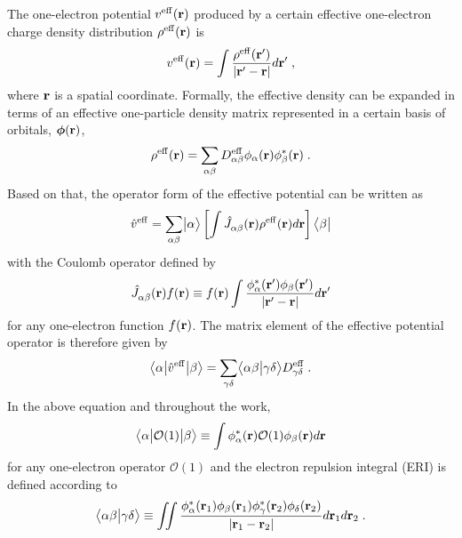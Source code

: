 The one\hyp{}electron potential $v^{\rm eff}({\bf r})$
produced by a certain effective one\hyp{}electron charge density distribution $\rho^{\rm eff}({\bf r})$
is 
%
\begin{equation} \label{e:v-eff}
	v^{\rm eff}({\bf r}) = \int \frac{ \rho^{\rm eff}({\bf r}') }{ \vert {\bf r}' - {\bf r} \vert} d{\bf r}' \;,
\end{equation}
%
where ${\bf r}$ is a spatial coordinate. Formally, the effective density can be expanded in terms of an effective
one\hyp{}particle density matrix represented in a certain basis of orbitals, $\BM{\phi}({\bf r})$,
%
\begin{equation} \label{e:d-spectral}
	\rho^{\rm eff}({\bf r}) = \sum_{\alpha\beta} D_{\alpha\beta}^{\rm eff} 
	\phi_\alpha({\bf r}) \phi_\beta^{*}({\bf r})  \;.
\end{equation}
%
Based on that, the operator form of the effective potential 
can be written as
%
\begin{equation} \label{e:oep-operator}
	\hat{v}^{\rm eff} = \sum_{\alpha\beta} 
	\Ket{\alpha} 
	\left[
	\int
	\hat{J}^{\rm}_{\alpha\beta}({\bf r}) 
	\rho^{\rm eff}({\bf r})
	d{\bf r} 
	\right]
	\Bra{\beta}  
\end{equation}
%
with the Coulomb operator defined by
%
\begin{equation}
	\hat{J}^{\rm}_{\alpha\beta}({\bf r}) f({\bf r}) \equiv
	f({\bf r}) 
	\int
	\frac{ \phi_\alpha^{*}({\bf r}') \phi_\beta({\bf r}') }{ \vert {\bf r}' - {\bf r} \vert} d{\bf r}'
\end{equation}
%
for any one\hyp{}electron function $f({\bf r})$. The matrix element of the effective potential operator
is therefore given by
%
\begin{equation}
	\tBraKet{\alpha}{ \hat{v}^{\rm eff} }{\beta}
	= \sum_{\gamma\delta} \BraKet{\alpha\beta}{\gamma\delta} D^{\rm eff}_{\gamma\delta}  \;.
\end{equation}
%
In the above equation and throughout the work, 
%
\begin{equation}
\tBraKet{\alpha}{\mathcal{O}(1)}{\beta} \equiv \int \phi^*_\alpha({\bf r}) \mathcal{O}(1) \phi_\beta({\bf r}) d{\bf r} 
\end{equation}
%
for any one\hyp{}electron operator $\mathcal{O}(1)$ 
and the electron repulsion integral (ERI)
is defined according to
%
\begin{equation}
	\BraKet{\alpha\beta}{\gamma\delta} \equiv
	\iint 
	\frac{ \phi_\alpha^{*}({\bf r}_1) \phi_\beta({\bf r}_1) 
	       \phi_\gamma^{*}({\bf r}_2) \phi_\delta({\bf r}_2) }{ \vert {\bf r}_1 - {\bf r}_2 \vert}
	d{\bf r}_1 d{\bf r}_2  \;.
\end{equation}
%


